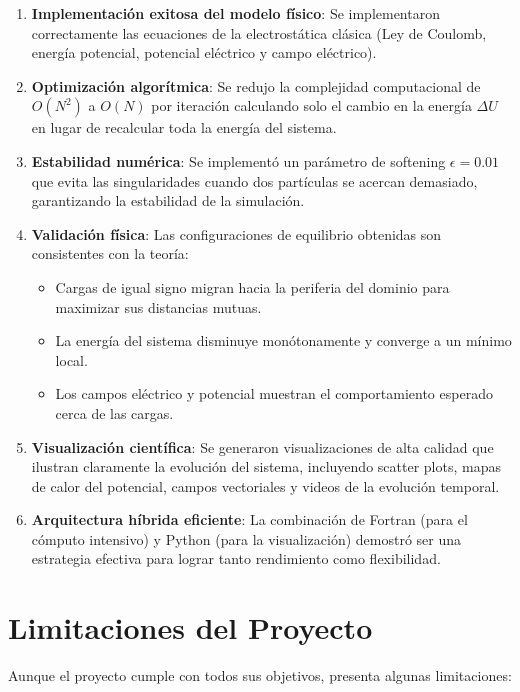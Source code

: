 \begin{enumerate}
    \item \textbf{Implementación exitosa del modelo físico}: Se implementaron correctamente las ecuaciones de la electrostática clásica (Ley de Coulomb, energía potencial, potencial eléctrico y campo eléctrico).
    
    \item \textbf{Optimización algorítmica}: Se redujo la complejidad computacional de \(O(N^2)\) a \(O(N)\) por iteración calculando solo el cambio en la energía \(\Delta U\) en lugar de recalcular toda la energía del sistema.
    
    \item \textbf{Estabilidad numérica}: Se implementó un parámetro de softening \(\epsilon = 0.01\) que evita las singularidades cuando dos partículas se acercan demasiado, garantizando la estabilidad de la simulación.
    
    \item \textbf{Validación física}: Las configuraciones de equilibrio obtenidas son consistentes con la teoría:
    \begin{itemize}
        \item Cargas de igual signo migran hacia la periferia del dominio para maximizar sus distancias mutuas.
        \item La energía del sistema disminuye monótonamente y converge a un mínimo local.
        \item Los campos eléctrico y potencial muestran el comportamiento esperado cerca de las cargas.
    \end{itemize}
    
    \item \textbf{Visualización científica}: Se generaron visualizaciones de alta calidad que ilustran claramente la evolución del sistema, incluyendo scatter plots, mapas de calor del potencial, campos vectoriales y videos de la evolución temporal.
    
    \item \textbf{Arquitectura híbrida eficiente}: La combinación de Fortran (para el cómputo intensivo) y Python (para la visualización) demostró ser una estrategia efectiva para lograr tanto rendimiento como flexibilidad.
\end{enumerate}

\section{Limitaciones del Proyecto}
Aunque el proyecto cumple con todos sus objetivos, presenta algunas limitaciones:

